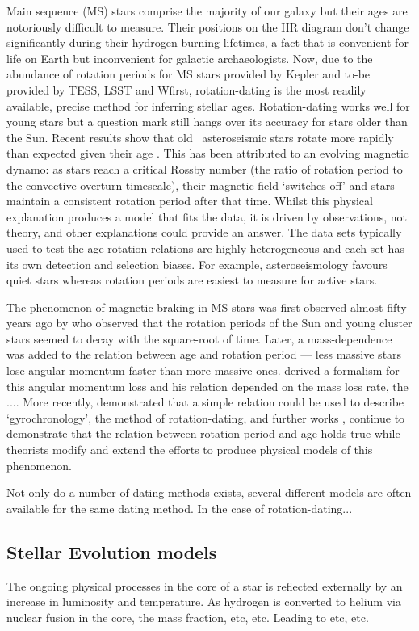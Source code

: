 Main sequence (MS) stars comprise the majority of our galaxy but their ages
are notoriously difficult to measure.
Their positions on the HR diagram don't change significantly during their
    hydrogen burning lifetimes, a fact that is convenient for life on Earth
    but inconvenient for galactic archaeologists.
Now, due to the abundance of rotation periods for MS stars provided by Kepler
    and to-be provided by TESS, LSST and Wfirst, rotation-dating is the most
    readily available, precise method for inferring stellar ages.
Rotation-dating works well for young stars but a question mark still hangs
    over its accuracy for stars older than the Sun.
Recent results show that old \kepler\ asteroseismic stars rotate more rapidly
    than expected given their age \citep[\eg][]{Angus2015, Vansaders2016,
    Metcalfe2016}.
This has been attributed to an evolving magnetic dynamo: as stars reach a
    critical Rossby number (the ratio of rotation period to the convective
    overturn timescale), their magnetic field `switches off' and stars
    maintain a consistent rotation period after that time.
Whilst this physical explanation produces a model that fits the data, it
    is driven by observations, not theory, and other explanations could
    provide an answer.
The data sets typically used to test the age-rotation relations are highly
    heterogeneous and each set has its own detection and selection biases.
For example, asteroseismology favours quiet stars whereas rotation periods are
    easiest to measure for active stars.

The phenomenon of magnetic braking in MS stars was first observed almost fifty
years ago by \citet{Skumanich1972} who observed that the rotation periods of
the Sun and young cluster stars seemed to decay with the square-root of time.
Later, a mass-dependence was added to the relation between age and rotation
period --- less massive stars lose angular momentum faster than more massive
ones.
\citet{Kawaler1988} derived a formalism for this angular momentum loss and his
relation depended on the mass loss rate, the ....
More recently, \citet{Barnes2003} demonstrated that a simple relation could be
used to describe `gyrochronology', the method of rotation-dating, and further
works \citep[\eg][]{Barnes2007, Mamajek2008, Barnes2010, Meibom2011},
continue to demonstrate that the relation between rotation period and age
holds true while theorists \citep[\eg][]{Matt2012, Epstein2014} modify and
extend the efforts to produce physical models of this phenomenon.

Not only do a number of dating methods exists, several different models are
often available for the same dating method.
In the case of rotation-dating...

\subsection{Stellar Evolution models}
The ongoing physical processes in the core of a star is reflected externally
by an increase in luminosity and temperature.
As hydrogen is converted to helium via nuclear fusion in the core, the mass
fraction, etc, etc.
Leading to etc, etc.

